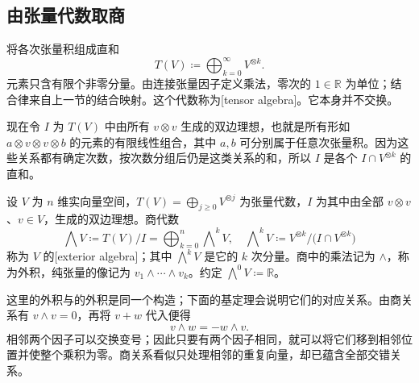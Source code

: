 \subsection{由张量代数取商}
\label{b1:subsec:B10202}

将各次张量积组成直和
\[
 T(V)\coloneqq\bigoplus_{k=0}^{\infty}V^{\otimes k}.
\]
元素只含有限个非零分量。由连接张量因子定义乘法，零次的 \(1\in\mathbb R\) 为单位；结合律来自上一节的结合映射。这个代数称为[tensor algebra]。它本身并不交换。

\ProseParagraphBreak

现在令 \(I\) 为 \(T(V)\) 中由所有 \(v\otimes v\) 生成的双边理想，也就是所有形如 \(a\otimes v\otimes v\otimes b\) 的元素的有限线性组合，其中 \(a,b\) 可分别属于任意次张量积。因为这些关系都有确定次数，按次数分组后仍是这类关系的和，所以 \(I\) 是各个 \(I\cap V^{\otimes k}\) 的直和。

\begin{definition}\label{b1:def:app-b-exterior-algebra}
设 \(V\) 为 \(n\) 维实向量空间，\(T(V)=\bigoplus_{j\ge0}V^{\otimes j}\) 为张量代数，\(I\) 为其中由全部 \(v\otimes v\)、\(v\in V\)，生成的双边理想。商代数
\[
 \bigwedge V\coloneqq T(V)/I
   =\bigoplus_{k=0}^{n}\bigwedge\nolimits^kV,
 \quad
 \bigwedge\nolimits^kV\coloneqq
   V^{\otimes k}/\bigl(I\cap V^{\otimes k}\bigr)
\]
称为 \(V\) 的[exterior algebra]；其中 \(\bigwedge^kV\) 是它的 \(k\) 次分量。商中的乘法记为 \(\wedge\)，称为外积，纯张量的像记为 \(v_1\wedge\cdots\wedge v_k\)。约定 \(\bigwedge^0V\coloneqq\mathbb R\)。
\end{definition}

这里的外积与的外积是同一个构造；下面的基定理会说明它们的对应关系。由商关系有 \(v\wedge v=0\)，再将 \(v+w\) 代入便得
\[
 v\wedge w=-w\wedge v.
\]
相邻两个因子可以交换变号；因此只要有两个因子相同，就可以将它们移到相邻位置并使整个乘积为零。商关系看似只处理相邻的重复向量，却已蕴含全部交错关系。

